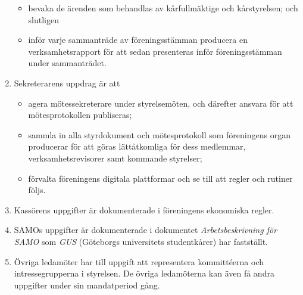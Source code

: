 \documentclass{dvd}
\begin{document}
\begin{enumerate}[label=\arabic* §, ref=\arabic*]
\begin{itemize}
		\item bevaka de ärenden som behandlas av kårfullmäktige och kårstyrelsen; och slutligen

		\item inför varje sammanträde av föreningsstämman producera en verksamhetsrapport för att sedan presenteras inför föreningsstämman under sammanträdet.
		\end{itemize}

		\item Sekreterarens uppdrag är att
		\begin{itemize}
		\item agera mötessekreterare under styrelsemöten, och därefter ansvara för att mötesprotokollen publiseras;

		\item sammla in alla styrdokument och mötesprotokoll som föreningens organ producerar för att göras lättåtkomliga för dess medlemmar, verksamhetsrevisorer samt kommande styrelser;

		\item förvalta föreningens digitala plattformar och se till att regler och rutiner följs.
		\end{itemize}

		\item Kassörens uppgifter är dokumenterade i föreningens ekonomiska regler.

		\item SAMOs uppgifter är dokumenterade i dokumentet \emph{Arbetsbeskrivning för SAMO} som \emph{GUS} (Göteborgs universitets studentkårer) har fastställt.

		\item Övriga ledamöter har till uppgift att representera kommittéerna och intressegrupperna i styrelsen.
		De övriga ledamöterna kan även få andra uppgifter under sin mandatperiod gång.
	\end{enumerate}
\end{document}
